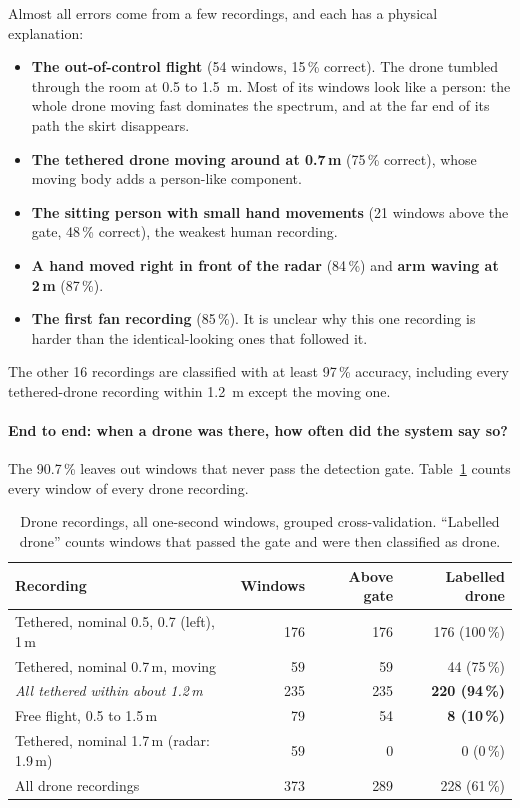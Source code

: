 \documentclass[11pt,a4paper]{article}
\begin{document}
Almost all errors come from a few recordings, and each has a physical explanation:
\begin{itemize}
\item \textbf{The out-of-control flight} (54 windows, 15\,\% correct). The drone tumbled through the room at 0.5 to \SI{1.5}{m}. Most of its windows look like a person: the whole drone moving fast dominates the spectrum, and at the far end of its path the skirt disappears.
\item \textbf{The tethered drone moving around at 0.7\,m} (75\,\% correct), whose moving body adds a person-like component.
\item \textbf{The sitting person with small hand movements} (21 windows above the gate, 48\,\% correct), the weakest human recording.
\item \textbf{A hand moved right in front of the radar} (84\,\%) and \textbf{arm waving at 2\,m} (87\,\%).
\item \textbf{The first fan recording} (85\,\%). It is unclear why this one recording is harder than the identical-looking ones that followed it.
\end{itemize}
The other 16 recordings are classified with at least 97\,\% accuracy, including every tethered-drone recording within \SI{1.2}{m} except the moving one.

\paragraph{End to end: when a drone was there, how often did the system say so?} The 90.7\,\% leaves out windows that never pass the detection gate. Table~\ref{tab:e2e} counts every window of every drone recording.

\begin{table}[h]\centering\small
\caption{Drone recordings, all one-second windows, grouped cross-validation. ``Labelled drone'' counts windows that passed the gate and were then classified as drone.}\label{tab:e2e}
\begin{tabular}{@{}lrrr@{}}\toprule
Recording & Windows & Above gate & Labelled drone\\\midrule
Tethered, nominal 0.5, 0.7 (left), 1\,m & 176 & 176 & 176 (100\,\%)\\
Tethered, nominal 0.7\,m, moving & 59 & 59 & 44 (75\,\%)\\
\emph{All tethered within about 1.2\,m} & 235 & 235 & \textbf{220 (94\,\%)}\\
Free flight, 0.5 to 1.5\,m & 79 & 54 & \textbf{8 (10\,\%)}\\
Tethered, nominal 1.7\,m (radar: 1.9\,m) & 59 & 0 & 0 (0\,\%)\\\midrule
All drone recordings & 373 & 289 & 228 (61\,\%)\\\bottomrule
\end{tabular}\end{table}
\end{document}
